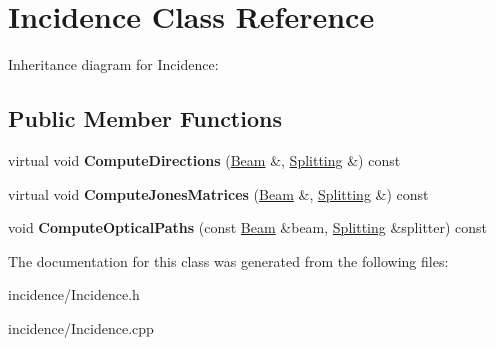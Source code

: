 \hypertarget{class_incidence}{}\section{Incidence Class Reference}
\label{class_incidence}


Inheritance diagram for Incidence\+:
\subsection*{Public Member Functions}
\begin{DoxyCompactItemize}
\item 
\mbox{\label{class_incidence_af17d5c74ea2928c821c799cf026aa35c}} 
virtual void {\bfseries Compute\+Directions} (\mbox{\hyperlink{class_beam}{Beam}} \&, \mbox{\hyperlink{class_splitting}{Splitting}} \&) const
\item 
\mbox{\label{class_incidence_a205492fd20d495d89948b4a0bebd7da3}} 
virtual void {\bfseries Compute\+Jones\+Matrices} (\mbox{\hyperlink{class_beam}{Beam}} \&, \mbox{\hyperlink{class_splitting}{Splitting}} \&) const
\item 
\mbox{\label{class_incidence_aeb94474ae1bf08abaf3c18e0500b96bd}} 
void {\bfseries Compute\+Optical\+Paths} (const \mbox{\hyperlink{class_beam}{Beam}} \&beam, \mbox{\hyperlink{class_splitting}{Splitting}} \&splitter) const
\end{DoxyCompactItemize}


The documentation for this class was generated from the following files\+:\begin{DoxyCompactItemize}
\item 
incidence/Incidence.\+h\item 
incidence/Incidence.\+cpp\end{DoxyCompactItemize}
